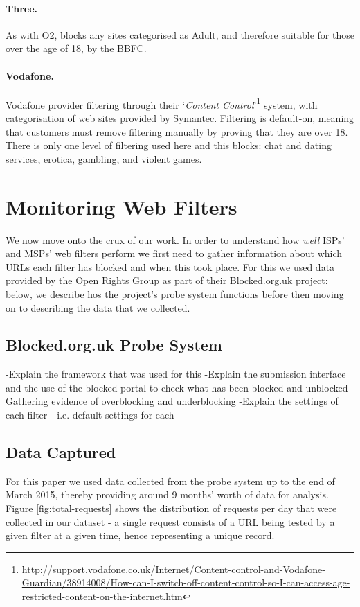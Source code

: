 \documentclass{bmcart}
\begin{document}
\paragraph{Three.}
As with O2, blocks any sites categorised as Adult, and therefore suitable for those over the age of 18, by the BBFC.

\paragraph{Vodafone.}
Vodafone provider filtering through their `\textit{Content Control}'\footnote{\url{http://support.vodafone.co.uk/Internet/Content-control-and-Vodafone-Guardian/38914008/How-can-I-switch-off-content-control-so-I-can-access-age-restricted-content-on-the-internet.htm}} system, with categorisation of web sites provided by Symantec.
Filtering is default-on, meaning that customers must remove filtering manually by proving that they are over 18.
There is only one level of filtering used here and this blocks: chat and dating services, erotica, gambling, and violent games.


\section*{Monitoring Web Filters}
We now move onto the crux of our work.
In order to understand how \textit{well} ISPs' and MSPs' web filters perform we first need to gather information about which URLs each filter has blocked and when this took place.
For this we used data provided by the Open Rights Group as part of their Blocked.org.uk project: below, we describe hos the project's probe system functions before then moving on to describing the data that we collected.

\subsection*{Blocked.org.uk Probe System}
-Explain the framework that was used for this
-Explain the submission interface and the use of the blocked portal to check what has been blocked and unblocked
-Gathering evidence of overblocking and underblocking
-Explain the settings of each filter - i.e. default settings for each

\subsection*{Data Captured}
For this paper we used data collected from the probe system up to the end of March 2015, thereby providing around 9 months' worth of data for analysis.
Figure \ref{fig:total-requests} shows the distribution of requests per day that were collected in our dataset - a single request consists of a URL being tested by a given filter at a given time, hence representing a unique record.
\end{document}

